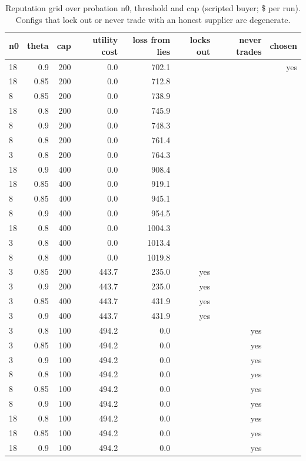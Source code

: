 \begin{table}[t]
\centering
\small
\caption{Reputation grid over probation n0, threshold and cap (scripted buyer; \$ per run). Configs that lock out or never trade with an honest supplier are degenerate.}
\label{tab:reputation_grid}
\begin{tabular}{lrrrrrrr}
\toprule
n0 & theta & cap & utility cost & loss from lies & locks out & never trades & chosen \\
\midrule
18 & 0.9 & 200 & 0.0 & 702.1 &  &  & yes \\
18 & 0.85 & 200 & 0.0 & 712.8 &  &  &  \\
8 & 0.85 & 200 & 0.0 & 738.9 &  &  &  \\
18 & 0.8 & 200 & 0.0 & 745.9 &  &  &  \\
8 & 0.9 & 200 & 0.0 & 748.3 &  &  &  \\
8 & 0.8 & 200 & 0.0 & 761.4 &  &  &  \\
3 & 0.8 & 200 & 0.0 & 764.3 &  &  &  \\
18 & 0.9 & 400 & 0.0 & 908.4 &  &  &  \\
18 & 0.85 & 400 & 0.0 & 919.1 &  &  &  \\
8 & 0.85 & 400 & 0.0 & 945.1 &  &  &  \\
8 & 0.9 & 400 & 0.0 & 954.5 &  &  &  \\
18 & 0.8 & 400 & 0.0 & 1004.3 &  &  &  \\
3 & 0.8 & 400 & 0.0 & 1013.4 &  &  &  \\
8 & 0.8 & 400 & 0.0 & 1019.8 &  &  &  \\
3 & 0.85 & 200 & 443.7 & 235.0 & yes &  &  \\
3 & 0.9 & 200 & 443.7 & 235.0 & yes &  &  \\
3 & 0.85 & 400 & 443.7 & 431.9 & yes &  &  \\
3 & 0.9 & 400 & 443.7 & 431.9 & yes &  &  \\
3 & 0.8 & 100 & 494.2 & 0.0 &  & yes &  \\
3 & 0.85 & 100 & 494.2 & 0.0 &  & yes &  \\
3 & 0.9 & 100 & 494.2 & 0.0 &  & yes &  \\
8 & 0.8 & 100 & 494.2 & 0.0 &  & yes &  \\
8 & 0.85 & 100 & 494.2 & 0.0 &  & yes &  \\
8 & 0.9 & 100 & 494.2 & 0.0 &  & yes &  \\
18 & 0.8 & 100 & 494.2 & 0.0 &  & yes &  \\
18 & 0.85 & 100 & 494.2 & 0.0 &  & yes &  \\
18 & 0.9 & 100 & 494.2 & 0.0 &  & yes &  \\
\bottomrule
\end{tabular}
\end{table}
